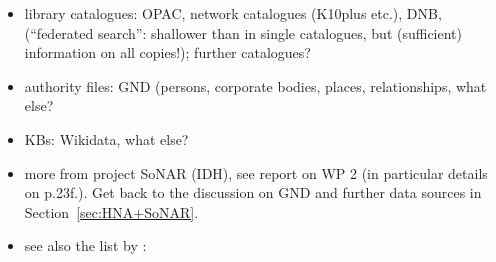 \begin{itemize}
  \item
    library catalogues: OPAC, network catalogues (K10plus etc.), DNB,
     (\enquote{federated search}: shallower than in single catalogues,
    but (sufficient) information on all copies!);
    further catalogues?
  \item
    authority files: \gls{GND} (persons, corporate bodies, places, relationships, what else?
  \item
    KBs: Wikidata, what else?
  \item
    more from project SoNAR (IDH), see report on WP 2 (in particular details on p.23f.).
    Get back to the discussion on \gls{GND} and further data sources in Section~\ref{sec:HNA+SoNAR}.
  \item
    see also the list by \autocite{Menzel2020}:


\end{itemize}
